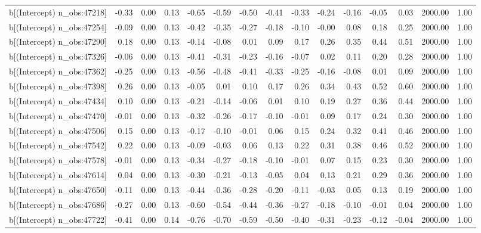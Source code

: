 \begin{table}[ht]
\begin{tabular}{rrrrrrrrrrrrrrr}
  b[(Intercept) n\_obs:47218] & -0.33 & 0.00 & 0.13 & -0.65 & -0.59 & -0.50 & -0.41 & -0.33 & -0.24 & -0.16 & -0.05 & 0.03 & 2000.00 & 1.00 \\ 
  b[(Intercept) n\_obs:47254] & -0.09 & 0.00 & 0.13 & -0.42 & -0.35 & -0.27 & -0.18 & -0.10 & -0.00 & 0.08 & 0.18 & 0.25 & 2000.00 & 1.00 \\ 
  b[(Intercept) n\_obs:47290] & 0.18 & 0.00 & 0.13 & -0.14 & -0.08 & 0.01 & 0.09 & 0.17 & 0.26 & 0.35 & 0.44 & 0.51 & 2000.00 & 1.00 \\ 
  b[(Intercept) n\_obs:47326] & -0.06 & 0.00 & 0.13 & -0.41 & -0.31 & -0.23 & -0.16 & -0.07 & 0.02 & 0.11 & 0.20 & 0.28 & 2000.00 & 1.00 \\ 
  b[(Intercept) n\_obs:47362] & -0.25 & 0.00 & 0.13 & -0.56 & -0.48 & -0.41 & -0.33 & -0.25 & -0.16 & -0.08 & 0.01 & 0.09 & 2000.00 & 1.00 \\ 
  b[(Intercept) n\_obs:47398] & 0.26 & 0.00 & 0.13 & -0.05 & 0.01 & 0.10 & 0.17 & 0.26 & 0.34 & 0.43 & 0.52 & 0.60 & 2000.00 & 1.00 \\ 
  b[(Intercept) n\_obs:47434] & 0.10 & 0.00 & 0.13 & -0.21 & -0.14 & -0.06 & 0.01 & 0.10 & 0.19 & 0.27 & 0.36 & 0.44 & 2000.00 & 1.00 \\ 
  b[(Intercept) n\_obs:47470] & -0.01 & 0.00 & 0.13 & -0.32 & -0.26 & -0.17 & -0.10 & -0.01 & 0.09 & 0.17 & 0.24 & 0.30 & 2000.00 & 1.00 \\ 
  b[(Intercept) n\_obs:47506] & 0.15 & 0.00 & 0.13 & -0.17 & -0.10 & -0.01 & 0.06 & 0.15 & 0.24 & 0.32 & 0.41 & 0.46 & 2000.00 & 1.00 \\ 
  b[(Intercept) n\_obs:47542] & 0.22 & 0.00 & 0.13 & -0.09 & -0.03 & 0.06 & 0.13 & 0.22 & 0.31 & 0.38 & 0.46 & 0.52 & 2000.00 & 1.00 \\ 
  b[(Intercept) n\_obs:47578] & -0.01 & 0.00 & 0.13 & -0.34 & -0.27 & -0.18 & -0.10 & -0.01 & 0.07 & 0.15 & 0.23 & 0.30 & 2000.00 & 1.00 \\ 
  b[(Intercept) n\_obs:47614] & 0.04 & 0.00 & 0.13 & -0.30 & -0.21 & -0.13 & -0.05 & 0.04 & 0.13 & 0.21 & 0.29 & 0.36 & 2000.00 & 1.00 \\ 
  b[(Intercept) n\_obs:47650] & -0.11 & 0.00 & 0.13 & -0.44 & -0.36 & -0.28 & -0.20 & -0.11 & -0.03 & 0.05 & 0.13 & 0.19 & 2000.00 & 1.00 \\ 
  b[(Intercept) n\_obs:47686] & -0.27 & 0.00 & 0.13 & -0.60 & -0.54 & -0.44 & -0.36 & -0.27 & -0.18 & -0.10 & -0.01 & 0.04 & 2000.00 & 1.00 \\ 
  b[(Intercept) n\_obs:47722] & -0.41 & 0.00 & 0.14 & -0.76 & -0.70 & -0.59 & -0.50 & -0.40 & -0.31 & -0.23 & -0.12 & -0.04 & 2000.00 & 1.00 \\ 

\end{tabular}
\end{table}
